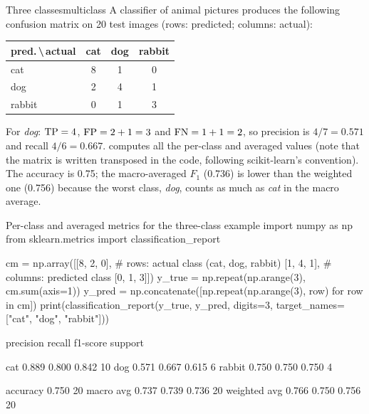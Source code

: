 \begin{example}{Three classes}{multiclass}
A classifier of animal pictures produces the following confusion matrix on 20 test images
(rows: predicted; columns: actual):
\begin{center}\small
\begin{tabular}{@{}lccc@{}}
\toprule
{\footnotesize pred.\,\textbackslash\,actual} & cat & dog & rabbit\\
\midrule
cat    & 8 & 1 & 0\\
dog    & 2 & 4 & 1\\
rabbit & 0 & 1 & 3\\
\bottomrule
\end{tabular}
\end{center}
For \emph{dog}: $\mathrm{TP}=4$, $\mathrm{FP}=2+1=3$ and $\mathrm{FN}=1+1=2$, so precision is $4/7=0.571$ and recall
$4/6=0.667$.  computes all the per-class and averaged values (note that
the matrix is written transposed in the code, following scikit-learn's convention). The
accuracy is 0.75; the macro-averaged $F_1$ (0.736) is lower than the weighted one (0.756)
because the worst class, \emph{dog}, counts as much as \emph{cat} in the macro average.
\end{example}

\begin{pylisting}[label={lst:multiclass}]{Per-class and averaged metrics for the three-class example}
import numpy as np
from sklearn.metrics import classification_report

cm = np.array([[8, 2, 0],      # rows: actual class (cat, dog, rabbit)
               [1, 4, 1],      # columns: predicted class
               [0, 1, 3]])
y_true = np.repeat(np.arange(3), cm.sum(axis=1))
y_pred = np.concatenate([np.repeat(np.arange(3), row) for row in cm])
print(classification_report(y_true, y_pred, digits=3,
                            target_names=["cat", "dog", "rabbit"]))
\end{pylisting}
\begin{pyoutput}
              precision    recall  f1-score   support

         cat      0.889     0.800     0.842        10
         dog      0.571     0.667     0.615         6
      rabbit      0.750     0.750     0.750         4

    accuracy                          0.750        20
   macro avg      0.737     0.739     0.736        20
weighted avg      0.766     0.750     0.756        20
\end{pyoutput}


